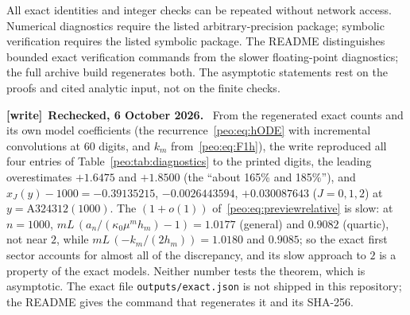 \documentclass[11pt]{article}
\numberwithin{equation}{section}
\theoremstyle{remark}\newtheorem{remark}[theorem]{Remark}
\newcommand{\file}[1]{\nolinkurl{#1}}
\newenvironment{writenote}[1][]{\par\smallskip\begingroup\small
 \noindent\textbf{[write]}\if\relax\detokenize{#1}\relax\else~\textbf{#1.}\fi\ }%
 {\par\endgroup\smallskip}
\begin{document}
All exact identities and integer checks can be repeated without network access. Numerical diagnostics require the listed arbitrary-precision package; symbolic verification requires the listed symbolic package. The README distinguishes bounded exact verification commands from the slower floating-point diagnostics; the full archive build regenerates both. The asymptotic statements rest on the proofs and cited analytic input, not on the finite checks.

\begin{writenote}[Rechecked, 6 October 2026]
From the regenerated exact counts and its own model coefficients (the
recurrence~\eqref{peo:eq:hODE} with incremental convolutions at 60 digits,
and $k_m$ from~\eqref{peo:eq:F1h}), the write reproduced all four entries of
Table~\ref{peo:tab:diagnostics} to the printed digits, the leading
overestimates $+1.6475$ and $+1.8500$ (the ``about 165\% and 185\%''), and
$x_J(y)-1000=-0.39135215$, $-0.0026443594$, $+0.030087643$ ($J=0,1,2$) at
$y=\mathrm{A324312}(1000)$. The $(1+o(1))$ of~\eqref{peo:eq:previewrelative}
is slow: at $n=1000$, $mL\,(a_n/(\kappa_0\mu^mh_m)-1)=1.0177$ (general) and
$0.9082$ (quartic), not near $2$, while $mL\,(-k_m/(2h_m))=1.0180$ and
$0.9085$; so the exact first sector accounts for almost all of the
discrepancy, and its slow approach to $2$ is a property of the exact
models. Neither number tests the theorem, which is asymptotic. The exact file \file{outputs/exact.json} is not
shipped in this repository; the README gives the command that regenerates it
and its SHA-256.
\end{writenote}
\end{document}
